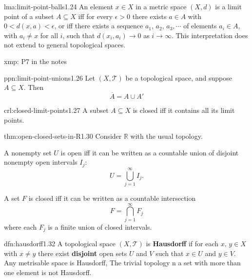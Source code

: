 \documentclass[landscape, 8pt]{extarticle}
\begin{document}
\begin{multicols}{3}
\newpage
\begin{lma}{lma:limit-point-balls}{1.24}
    An element $x\in X$ in a metric space $(X, d)$ is a limit point of a subset $A \subseteq X$ iff for every $\epsilon > 0$ there exists $a\in A$ with $0<d(x,a)<\epsilon$, or iff there exists a sequence $a_{1},\,a_{2},\,a_{3},\cdots$ of elements $a_{i}\in A$, with $a_{i}  \ne x$ for all $i$, such that $d(x_{i}, a_{i}) \to 0$ as $i \to\infty$. This interpretation does not extend to general topological spaces.
\end{lma}

\begin{xmp}{xmp:}{}
    P7 in the notes
\end{xmp}

\begin{ppn}{ppn:limit-point-unions}{1.26}
    Let $(X, \mathcal{T})$ be a topological space, and suppose $A \subseteq X$. Then
    \[\overline{A} = A \cup A'\]
\end{ppn}

\begin{crl}[]{crl:closed-limit-points}{1.27}
    A subset $A \subseteq X$ is closed iff it contains all its limit points.
\end{crl}

\begin{thm}{thm:open-closed-sets-in-R}{1.30}
    Consider $\mathbb{R}$ with the usual topology.
    \begin{enumerate-zero}
        \item A nonempty set $U$ is open iff it can be written as a countable union of disjoint nonempty open intervals $I_{j}$:
            \[U = \bigcup_{j=1}^{\infty} I_{j}.\]
        \item A set $F$ is closed iff it can be written as a countable intersection
            \[F = \bigcap_{j=1}^{\infty} F_{j}\]
            where each $F_{j}$ is a finite union of closed intervals.
    \end{enumerate-zero}
\end{thm}

\begin{dfn}{dfn:hausdorff}{1.32}
    A topological space $(X, \mathcal{T})$ is \textbf{Hausdorff} if for each $x,\,y\in X$ with $x \ne y$ there exist \textbf{disjoint} open sets $U$ and $V$ such that $x\in U$ and $y\in V$.
    \longrule{0.08ex}
    Any metrisable space is Hausdorff, The trivial topology n a set with more than one element is not Hausdorff.
\end{dfn}


\end{multicols}
\end{document}
